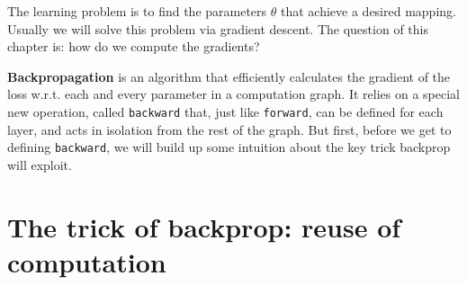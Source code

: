 
The learning problem is to find the parameters \colorbox{comp_graph_param_bcolor}{$\theta$} that achieve a desired mapping. Usually we will solve this problem via gradient descent. The question of this chapter is: how do we compute the gradients? 

\textbf{Backpropagation} is an algorithm that efficiently calculates the gradient of the loss w.r.t. each and every parameter in a computation graph. It relies on a special new operation, called \texttt{backward} that, just like \texttt{forward}, can be defined for each layer, and acts in isolation from the rest of the graph. But first, before we get to defining \texttt{backward}, we will build up some intuition about the key trick backprop will exploit.

\section{The trick of backprop: reuse of computation}

